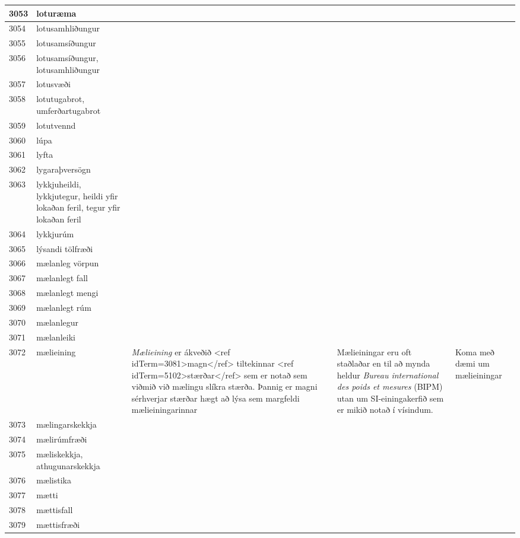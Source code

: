\begin{longtable}{p{}|p{}|p{}|p{}|p{}}
\hline
3053 & loturæma &  &  &  \\
\hline
3054 & lotusamhliðungur &  &  &  \\
\hline
3055 & lotusamsíðungur &  &  &  \\
\hline
3056 & lotusamsíðungur, lotusamhliðungur &  &  &  \\
\hline
3057 & lotusvæði &  &  &  \\
\hline
3058 & lotutugabrot, umferðartugabrot &  &  &  \\
\hline
3059 & lotutvennd &  &  &  \\
\hline
3060 & lúpa &  &  &  \\
\hline
3061 & lyfta &  &  &  \\
\hline
3062 & lygaraþversögn &  &  &  \\
\hline
3063 & lykkjuheildi, lykkjutegur, heildi yfir lokaðan feril, tegur yfir lokaðan feril &  &  &  \\
\hline
3064 & lykkjurúm &  &  &  \\
\hline
3065 & lýsandi tölfræði &  &  &  \\
\hline
3066 & mælanleg vörpun &  &  &  \\
\hline
3067 & mælanlegt fall &  &  &  \\
\hline
3068 & mælanlegt mengi &  &  &  \\
\hline
3069 & mælanlegt rúm &  &  &  \\
\hline
3070 & mælanlegur &  &  &  \\
\hline
3071 & mælanleiki &  &  &  \\
\hline
3072 & mælieining & \textit{Mælieining} er ákveðið <ref idTerm=3081>magn</ref> tiltekinnar <ref idTerm=5102>stærðar</ref> sem er notað sem viðmið við mælingu slíkra stærða. Þannig er magni sérhverjar stærðar hægt að lýsa sem margfeldi mælieiningarinnar & Mælieiningar eru oft staðlaðar en til að mynda heldur \textit{Bureau international des poids et mesures} (BIPM) utan um SI-einingakerfið sem er mikið notað í vísindum. & Koma með dæmi um mælieiningar \\
\hline
3073 & mælingarskekkja &  &  &  \\
\hline
3074 & mælirúmfræði &  &  &  \\
\hline
3075 & mæliskekkja, athugunarskekkja &  &  &  \\
\hline
3076 & mælistika &  &  &  \\
\hline
3077 & mætti &  &  &  \\
\hline
3078 & mættisfall &  &  &  \\
\hline
3079 & mættisfræði &  &  &  \\

\end{longtable}

